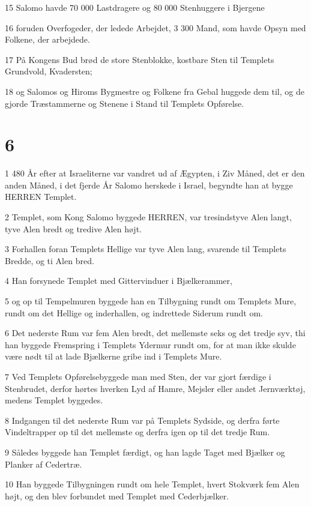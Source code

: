 \par 15 Salomo havde 70 000 Lastdragere og 80 000 Stenhuggere i Bjergene
\par 16 foruden Overfogeder, der ledede Arbejdet, 3 300 Mand, som havde Opsyn med Folkene, der arbejdede.
\par 17 På Kongens Bud brød de store Stenblokke, kostbare Sten til Templets Grundvold, Kvadersten;
\par 18 og Salomos og Hiroms Bygmestre og Folkene fra Gebal huggede dem til, og de gjorde Træstammerne og Stenene i Stand til Templets Opførelse.

\chapter{6}

\par 1 480 År efter at Israeliterne var vandret ud af Ægypten, i Ziv Måned, det er den anden Måned, i det fjerde År Salomo herskede i Israel, begyndte han at bygge HERREN Templet.
\par 2 Templet, som Kong Salomo byggede HERREN, var tresindstyve Alen langt, tyve Alen bredt og tredive Alen højt.
\par 3 Forhallen foran Templets Hellige var tyve Alen lang, svarende til Templets Bredde, og ti Alen bred.
\par 4 Han forsynede Templet med Gittervinduer i Bjælkerammer,
\par 5 og op til Tempelmuren byggede han en Tilbygning rundt om Templets Mure, rundt om det Hellige og inderhallen, og indrettede Siderum rundt om.
\par 6 Det nederste Rum var fem Alen bredt, det mellemste seks og det tredje syv, thi han byggede Fremspring i Templets Ydermur rundt om, for at man ikke skulde være nødt til at lade Bjælkerne gribe ind i Templets Mure.
\par 7 Ved Templets Opførelsebyggede man med Sten, der var gjort færdige i Stenbrudet, derfor hørtes hverken Lyd af Hamre, Mejsler eller andet Jernværktøj, medens Templet byggedes.
\par 8 Indgangen til det nederste Rum var på Templets Sydside, og derfra førte Vindeltrapper op til det mellemste og derfra igen op til det tredje Rum.
\par 9 Således byggede han Templet færdigt, og han lagde Taget med Bjælker og Planker af Cedertræ.
\par 10 Han byggede Tilbygningen rundt om hele Templet, hvert Stokværk fem Alen højt, og den blev forbundet med Templet med Cederbjælker.
